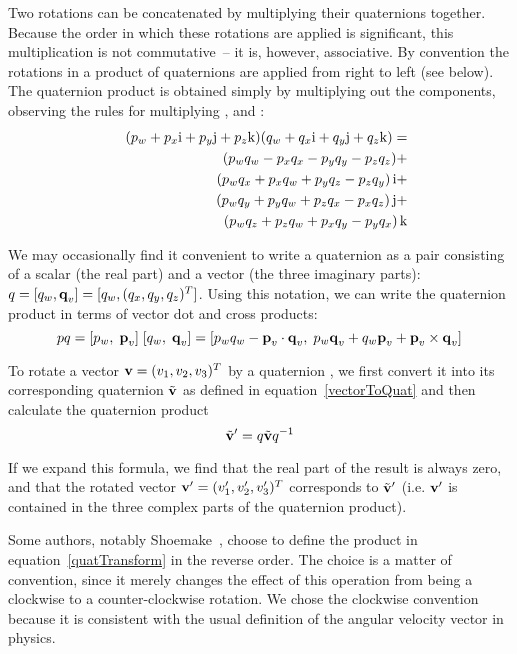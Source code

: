 Two rotations can be concatenated by multiplying their quaternions together. Because the order
in which these rotations are applied is significant, this multiplication is not commutative~--
it is, however, associative. By convention the rotations in a product of quaternions are applied
from right to left (see below). The quaternion product is obtained simply by multiplying out the
components, observing the rules for multiplying \qi{}, \qj{} and \qk{}:
\begin{eqnarray}
&& (p_w + p_x\mbox{$\mathrm{i}$} + p_y\mbox{$\mathrm{j}$} + p_z\mbox{$\mathrm{k}$})(q_w + q_x\mbox{$\mathrm{i}$} + q_y\mbox{$\mathrm{j}$} + q_z\mbox{$\mathrm{k}$}) = \nonumber\\*
&& \quad\quad\quad (p_w q_w - p_x q_x - p_y q_y - p_z q_z) + \nonumber\\*
&& \quad\quad\quad (p_w q_x + p_x q_w + p_y q_z - p_z q_y) \,\mbox{$\mathrm{i}$} + \nonumber\\*
&& \quad\quad\quad (p_w q_y + p_y q_w + p_z q_x - p_x q_z) \,\mbox{$\mathrm{j}$} + \nonumber\\*
&& \quad\quad\quad (p_w q_z + p_z q_w + p_x q_y - p_y q_x) \,\mbox{$\mathrm{k}$}
\end{eqnarray}

We may occasionally find it convenient to write a quaternion as a pair consisting of a scalar
(the real part) and a vector (the three imaginary parts):
$\q{q} = [q_w, \ve{q}_v] = [q_w, (q_x, q_y, q_z)^T]$. Using this notation, we can write the
quaternion product in terms of vector dot and cross products:
\begin{equation}
\q{p}\q{q} = [p_w,\; \ve{p}_v]\;[q_w,\; \ve{q}_v] =
    [p_w q_w - \ve{p}_v \cdot \ve{q}_v,\;
    p_w \ve{q}_v + q_w \ve{p}_v + \ve{p}_v \times \ve{q}_v]
\end{equation}

To rotate a vector $\ve{v} = (v_1, v_2, v_3)^T$ by a quaternion , we first
convert it into its corresponding quaternion $\tilde{\ve{v}}$ as defined in
equation~\ref{vectorToQuat} and then calculate the quaternion product
\begin{equation}
\label{quatTransform}
\tilde{\ve{v}}^\prime = \q{q}\tilde{\ve{v}}\q{q}^{-1}
\end{equation}

If we expand this formula, we find that the real part of the result is always zero, and
that the rotated vector $\ve{v}^\prime = (v_1^\prime, v_2^\prime, v_3^\prime)^T$ corresponds
to $\tilde{\ve{v}}^\prime$ (i.e. $\ve{v}^\prime$ is contained in the three complex parts of
the quaternion product).

Some authors, notably Shoemake~\cite{Shoemake:85}, choose to define the product in
equation~\ref{quatTransform} in
the reverse order. The choice is a matter of convention, since it merely changes the effect
of this operation from being a clockwise to a counter-clockwise rotation. We chose the clockwise
convention because it is consistent with the usual definition of the angular velocity vector
in physics.

